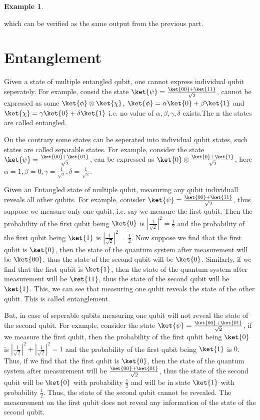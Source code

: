 \documentclass[12pt, oneside]{book}
\theoremstyle{definition}
\theoremstyle{definition}
\newtheorem{example}{Example}[section]
\theoremstyle{remark}
\begin{document}
\begin{example}
\begin{enumerate}
\[        \]
        which can be verified as the same output from the previous part.
    \end{enumerate}
\end{example}

\section{Entanglement}
Given a state of multiple entangled qubit, one cannot express individual qubit seperately.
For example, consid the state $\ket{\psi} = \frac{\ket{00}+\ket{11}}{\sqrt{2}}$, cannot be expressed as some $\ket{\phi} \otimes \ket{\chi}$,
$\ket{\phi}=\alpha \ket{0} + \beta \ket{1}$ and $\ket{\chi}=\gamma \ket{0} + \delta \ket{1}$ i.e. no value of $\alpha, \beta, \gamma, \delta$ exists.The
n the states are called entangled.

On the contrary some states can be seperated into individual qubit states, such states are called separable states.
For example, consider the state $\ket{\psi} = \frac{\ket{00}+\ket{01}}{\sqrt{2}}$, can be expressed as $\ket{0} \otimes \frac{\ket{0}+\ket{1}}{\sqrt{2}}$, here
$\alpha =1 ,\beta =0,\gamma = \frac{1}{\sqrt{2}},\delta = \frac{1}{\sqrt{2}}$.

Given an Entangled state of multiple qubit, measuring any qubit individuall reveals all other qubits. 
For example, conisder $\ket{\psi}=\frac{\ket{00}+\ket{11}}{\sqrt{2}}$, thus suppose we measure only one qubit, i.e.
say we measure the first qubit. Then the probability of the first qubit being $\ket{0}$ is $|\frac{1}{\sqrt{2}}|^2=\frac{1}{2}$ and the probability of the first qubit being $\ket{1}$ is $|\frac{1}{\sqrt{2}}|^2=\frac{1}{2}$.
Now suppose we find that the first qubit is $\ket{0}$, then the state of the quantum system after measurement will be $\ket{00}$, thus the state of the second qubit will be $\ket{0}$.
Similarly, if we find that the first qubit is $\ket{1}$, then the state of the quantum system after measurement will be $\ket{11}$, thus the state of the second qubit will be $\ket{1}$.
This, we can see that measuring one qubit reveals the state of the other qubit. This is called entanglement.

But, in case of seperable qubits measuring one qubit will not reveal the state of the second qubit. For example, consider the state $\ket{\psi}=\frac{\ket{00}+\ket{01}}{\sqrt{2}}$,
if we measure the first qubit, then the probability of the first qubit being $\ket{0}$ is $|\frac{1}{\sqrt{2}}|^2+|\frac{1}{\sqrt{2}}|^2=1$ and the probability of the first qubit being $\ket{1}$ is $0$.
Thus, if we find that the first qubit is $\ket{0}$, then the state of the quantum system after measurement will be $\frac{\ket{00}+\ket{01}}{\sqrt{2}}$, thus the state of the second qubit will be $\ket{0}$ with probability $\frac{1}{2}$ and 
will be in state $\ket{1}$ with probability $\frac{1}{2}$. Thus, the state of the second qubit cannot be revealed. The measurement on the first qubit does not reveal any information of the state of the second qubit. 
\end{document}
